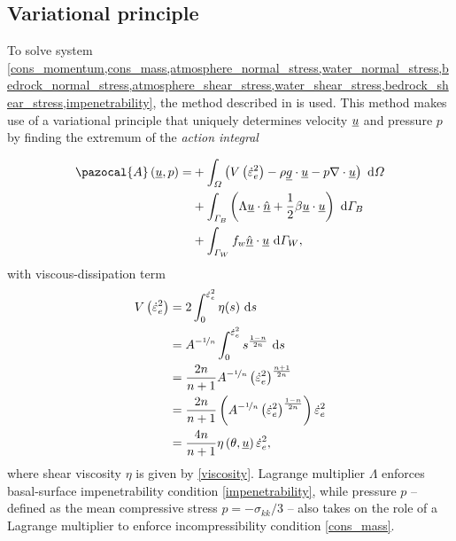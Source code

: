 \subsection{Variational principle} \label{ssn_full_stokes_var_prin}

To solve system \cref{cons_momentum,cons_mass,atmosphere_normal_stress,water_normal_stress,bedrock_normal_stress,atmosphere_shear_stress,water_shear_stress,bedrock_shear_stress,impenetrability}, the method described in \citet{dukowicz_2010} is used.
This method makes use of a variational principle that uniquely determines velocity $\underline{u}$ and pressure $p$ by finding the extremum of the \emph{action integral}

\begin{align}
  \label{action}
  \pazocal{A} \left(\rankone{u}, p\right) = &+ \int_{\Omega} \left( V\left( \dot{\varepsilon}_e^2 \right) - \rho \rankone{g} \cdot \rankone{u} - p \nabla \cdot \rankone{u} \right) \d{\Omega} \notag \\
  &+ \int_{\Gamma_B} \left( \Lambda \rankone{u} \cdot \normal + \frac{1}{2} \beta \rankone{u} \cdot \rankone{u} \right) \d{\Gamma_B} \notag \\
  &+ \int_{\Gamma_W} f_w \normal \cdot \rankone{u} \d{\Gamma_W},
\end{align}
with viscous-dissipation term
\begin{align}
  \label{viscous_dissipation}
  V\left( \dot{\varepsilon}_e^2 \right) &= 2 \int_0^{\dot{\varepsilon}_e^2} \eta(s) \ \mathrm{d}s \notag \\
  &= A^{-\nicefrac{1}{n}} \int_0^{\dot{\varepsilon}_e^2} s^{\frac{1-n}{2n}} \ \mathrm{d}s \notag \\
  &= \frac{2n}{n+1} A^{-\nicefrac{1}{n}} \left( \dot{\varepsilon}_e^2 \right)^{\frac{n+1}{2n}} \notag \\
  &= \frac{2n}{n+1} \left( A^{-\nicefrac{1}{n}} \left( \dot{\varepsilon}_e^2 \right)^{\frac{1-n}{2n}} \right) \dot{\varepsilon}_e^2 \notag \\
  &= \frac{4n}{n+1} \eta\left(\theta, \underline{u} \right) \dot{\varepsilon}_e^2,
\end{align}
where shear viscosity $\eta$ is given by \cref{viscosity}.  Lagrange multiplier $\Lambda$ enforces basal-surface impenetrability condition \cref{impenetrability}, while pressure $p$ -- defined as the mean compressive stress $p = -\sigma_{kk} / 3$ -- also takes on the role of a Lagrange multiplier to enforce incompressibility condition \cref{cons_mass}.

